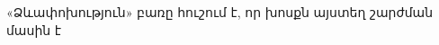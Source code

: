 \documentclass[12pt]{beamer}
\begin{document}
\begin{frame}
    \textarmenian{«Ձևափոխություն»} \textarmenian{բառը հուշում է, որ խոսքն այստեղ} \textarmenian{շարժման} \textarmenian{մասին է}
\end{frame}
\end{document}
